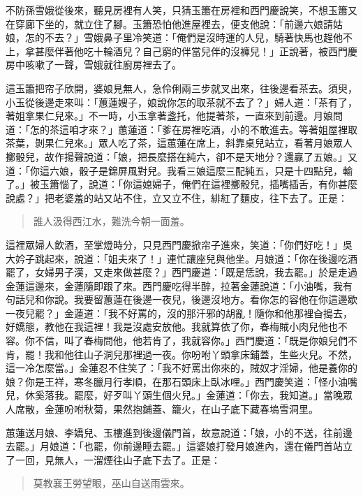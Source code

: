 不防孫雪娥從後來，聽見房裡有人笑，只猜玉簫在房裡和西門慶說笑，不想玉簫又在穿廊下坐的，就立住了腳。玉簫恐怕他進屋裡去，便支他說：「前邊六娘請姑娘，怎的不去？」雪娥鼻子里冷笑道：「俺們是沒時運的人兒，騎著快馬也趕他不上，拿甚麼伴著他吃十輪酒兒？自己窮的伴當兒伴的沒褲兒！」正說著，被西門慶房中咳嗽了一聲，雪娥就往廚房裡去了。

這玉簫把帘子欣開，婆娘見無人，急伶俐兩三步就叉出來，往後邊看茶去。須臾，小玉從後邊走來叫：「蕙蓮嫂子，娘說你怎的取茶就不去了？」婦人道：「茶有了，著姐拿果仁兒來。」不一時，小玉拿著盞托，他提著茶，一直來到前邊。月娘問道：「怎的茶這咱才來？」蕙蓮道：「爹在房裡吃酒，小的不敢進去。等著姐屋裡取茶葉，剝果仁兒來。」眾人吃了茶，這蕙蓮在席上，斜靠桌兒站立，看著月娘眾人擲骰兒，故作揚聲說道：「娘，把長麼搭在純六，卻不是天地分？還贏了五娘。」又道：「你這六娘，骰子是錦屏風對兒。我看三娘這麼三配純五，只是十四點兒，輸了。」被玉簫惱了，說道：「你這媳婦子，俺們在這裡擲骰兒，插嘴插舌，有你甚麼說處？」把老婆羞的站又站不住，立又立不住，緋紅了麵皮，往下去了。正是：
\begin{quote}
誰人汲得西江水，難洗今朝一面羞。
\end{quote}

這裡眾婦人飲酒，至掌燈時分，只見西門慶掀帘子進來，笑道：「你們好吃！」吳大妗子跳起來，說道：「姐夫來了！」連忙讓座兒與他坐。月娘道：「你在後邊吃酒罷了，女婦男子漢，又走來做甚麼？」西門慶道：「既是恁說，我去罷。」於是走過金蓮這邊來，金蓮隨即跟了來。西門慶吃得半醉，拉著金蓮說道：「小油嘴，我有句話兒和你說。我要留蕙蓮在後邊一夜兒，後邊沒地方。看你怎的容他在你這邊歇一夜兒罷？」金蓮道：「我不好罵的，沒的那汗邪的胡亂！隨你和他那裡㒲搗去，好嬌態，教他在我這裡！我是沒處安放他。我就算依了你，春梅賊小肉兒他也不容。你不信，叫了春梅問他，他若肯了，我就容你。」西門慶道：「既是你娘兒們不肯，罷！我和他往山子洞兒那裡過一夜。你吩咐丫頭拿床鋪蓋，生些火兒。不然，這一冷怎麼當。」金蓮忍不住笑了：「我不好罵出你來的，賊奴才淫婦，他是養你的娘？你是王祥，寒冬臘月行孝順，在那石頭床上臥冰哩。」西門慶笑道：「怪小油嘴兒，休奚落我。罷麼，好歹叫丫頭生個火兒。」金蓮道：「你去，我知道。」當晚眾人席散，金蓮吩咐秋菊，果然抱鋪蓋、籠火，在山子底下藏春塢雪洞里。

蕙蓮送月娘、李嬌兒、玉樓進到後邊儀門首，故意說道：「娘，小的不送，往前邊去罷。」月娘道：「也罷，你前邊睡去罷。」這婆娘打發月娘進內，還在儀門首站立了一回，見無人，一溜煙往山子底下去了。正是：
\begin{quote}
莫教襄王勞望眼，巫山自送雨雲來。
\end{quote}

